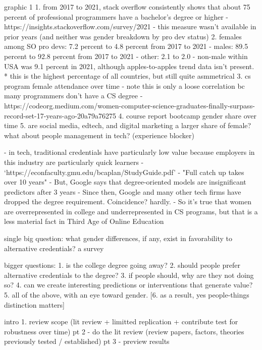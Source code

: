 \documentclass[review]{elsarticle}
\begin{document}
graphic 1
1. from 2017 to 2021, stack overflow consistently shows that about 75 percent of professional programmers have a bachelor's degree or higher
  - https://insights.stackoverflow.com/survey/2021
  - this measure wasn't available in prior years (and neither was gender breakdown by pro dev status)
2. females among SO pro devs: 7.2 percent to 4.8 percent from 2017 to 2021
  - males: 89.5 percent to 92.8 percent from 2017 to 2021
  - other: 2.1 to 2.0
  - non-male within USA was 9.1 percent in 2021, although apples-to-apples trend data isn't present.
      * this is the highest percentage of all countries, but still quite asmmetrical
3. cs program female attendance over time
  - note this is only a loose correlation bc many programmers don't have a CS degree
  - https://codeorg.medium.com/women-computer-science-graduates-finally-surpass-record-set-17-years-ago-20a79a76275
4. course report bootcamp gender share over time
5. are social media, edtech, and digital marketing a larger share of female? what about people management in tech? (experience blocker)

- in tech, traditional credentials have particularly low value because employers in this industry are particularly quick learners
   - `https://econfaculty.gmu.edu/bcaplan/StudyGuide.pdf'
   - "Full catch up takes over 10 years"
   - But, Google says that degree-oriented models are insignificant predictors after 3 years
   - Since then, Google and many other tech firms have dropped the degree requirement. Coincidence? hardly.
   - So it's true that women are overrepresented in college and underrepresented in CS programs, but that is a less material fact in Third Age of Online Education


single big question: what gender differences, if any, exist in favorability to alternative credentials?
a survey

bigger questions:
1. is the college degree going away?
2. should people prefer alternative credentials to the degree?
3. if people should, why are they not doing so?
4. can we create interesting predictions or interventions that generate value?
5. all of the above, with an eye toward gender.
[6. as a result, yes people-things distinction matters]

intro 1. review scope (lit review + limitted replication + contribute test for robustness over time)
pt 2 - do the lit review (review papers, factors, theories previously tested / established)
pt 3 - preview results
\end{document}
